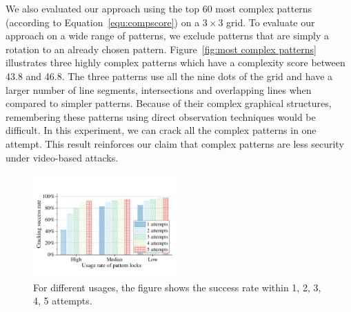        We also evaluated our approach using the top 60 most complex
        patterns (according to Equation~\ref {equ:compscore}) on a $3 \times 3$
        grid.
        To evaluate our approach on a wide range of patterns, we exclude patterns that are simply a rotation to an already chosen pattern.
         Figure~\ref {fig:most complex patterns} illustrates three
        highly complex patterns which have a complexity score between 43.8 and 46.8. The three
        patterns use all the nine dots of the grid and have a larger number of line segments, intersections and overlapping lines when compared to simpler patterns.
        Because of their complex graphical structures, remembering
        these patterns using direct observation techniques would be difficult.
        In this experiment, we can crack all the complex patterns in one attempt. This result reinforces our claim that complex
        patterns are less security under video-based attacks.

        \begin{figure}[!t]
            \centering
            \includegraphics[width=0.5\textwidth]{fig/usibility_crackingNum.pdf}
            \caption{For different usages, the figure shows the success rate within 1, 2, 3, 4, 5 attempts.}
            \label{fig:usage-crackingNum}
        \end{figure}
        
